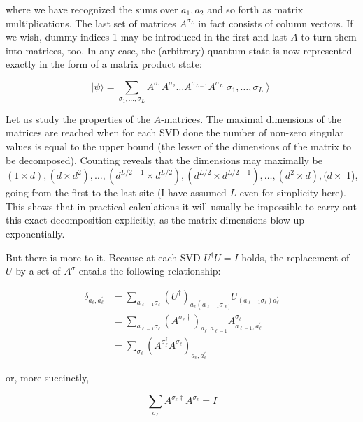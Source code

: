 \documentclass[12pt]{article}
\begin{document}
where we have recognized the sums over $a_{1}, a_{2}$ and so forth as matrix multiplications. The last set of matrices $A^{\sigma_{L}}$ in fact consists of column vectors. If we wish, dummy indices 1 may be introduced in the first and last $A$ to turn them into matrices, too. In any case, the (arbitrary) quantum state is now represented exactly in the form of a matrix product state:


\begin{equation*}
|\psi\rangle=\sum_{\sigma_{1}, \ldots, \sigma_{L}} A^{\sigma_{1}} A^{\sigma_{2}} \ldots A^{\sigma_{L-1}} A^{\sigma_{L}}\left|\sigma_{1}, \ldots, \sigma_{L}\right\rangle \tag{37}
\end{equation*}


Let us study the properties of the $A$-matrices. The maximal dimensions of the matrices are reached when for each SVD done the number of non-zero singular values is equal to the upper bound (the lesser of the dimensions of the matrix to be decomposed). Counting reveals that the dimensions may maximally be $(1 \times d),\left(d \times d^{2}\right), \ldots,\left(d^{L / 2-1} \times d^{L / 2}\right),\left(d^{L / 2} \times d^{L / 2-1}\right), \ldots,\left(d^{2} \times d\right),(d \times$ 1), going from the first to the last site (I have assumed $L$ even for simplicity here). This shows that in practical calculations it will usually be impossible to carry out this exact decomposition explicitly, as the matrix dimensions blow up exponentially.

But there is more to it. Because at each SVD $U^{\dagger} U=I$ holds, the replacement of $U$ by a set of $A^{\sigma}$ entails the following relationship:

$$
\begin{aligned}
\delta_{a_{\ell}, a_{\ell}^{\prime}} & =\sum_{a_{\ell-1} \sigma_{\ell}}\left(U^{\dagger}\right)_{a_{\ell}\left(a_{\ell-1} \sigma_{\ell)}\right.} U_{\left(a_{\ell-1} \sigma_{\ell}\right) a_{\ell}^{\prime}} \\
& =\sum_{a_{\ell-1} \sigma_{\ell}}\left(A^{\sigma_{\ell} \dagger}\right)_{a_{\ell}, a_{\ell-1}} A_{a_{\ell-1}, a_{\ell}^{\prime}}^{\sigma_{\ell}} \\
& =\sum_{\sigma_{\ell}}\left(A^{\sigma_{\ell}^{\dagger}} A^{\sigma_{\ell}}\right)_{a_{\ell}, a_{\ell}^{\prime}}
\end{aligned}
$$

or, more succinctly,


\begin{equation*}
\sum_{\sigma_{\ell}} A^{\sigma_{\ell} \dagger} A^{\sigma_{\ell}}=I \tag{38}
\end{equation*}
\end{document}
